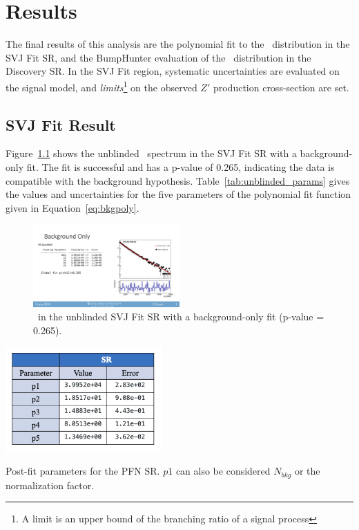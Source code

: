 \chapter{Results}
\label{ch:results}
The final results of this analysis are the polynomial fit to the \mt~distribution in the SVJ Fit SR, and the BumpHunter evaluation of the \mt~distribution in the Discovery SR. In the SVJ Fit region, systematic uncertainties are evaluated on the signal model, and \textit{limits}\footnote{A limit is an upper bound of the branching ratio of a signal process} on the observed $Z'$ production cross-section are set. 

\section{SVJ Fit Result}
\label{sec:results_svj}
Figure~\ref{fig:unblinded_PFN_bonly} shows the unblinded \mt~spectrum in the SVJ Fit SR with a background-only fit. 
The fit is successful and has a p-value of 0.265, indicating the data is compatible with the background hypothesis. 
Table~\ref{tab:unblinded_params} gives the values and uncertainties for the five parameters of the polynomial fit function given in Equation~\ref{eq:bkgpoly}. 
\begin{figure}[!htbp]
\centering
   \includegraphics[width=0.5\textwidth]{figures/results/unblinded_PFN_bonly}
    \caption{\mt~in the unblinded SVJ Fit SR with a background-only fit (p-value = 0.265).
    \label{fig:unblinded_PFN_bonly}}
\end{figure}

\begin{table}[!htbp]
\centering
   \includegraphics[width=0.45\textwidth]{figures/results/postfit_param_pfnSR}
    \caption{Post-fit parameters for the PFN SR. $p1$ can also be considered $N_{bkg}$ or the normalization factor.
    \label{tab:unblinded_params}}
\end{table}

